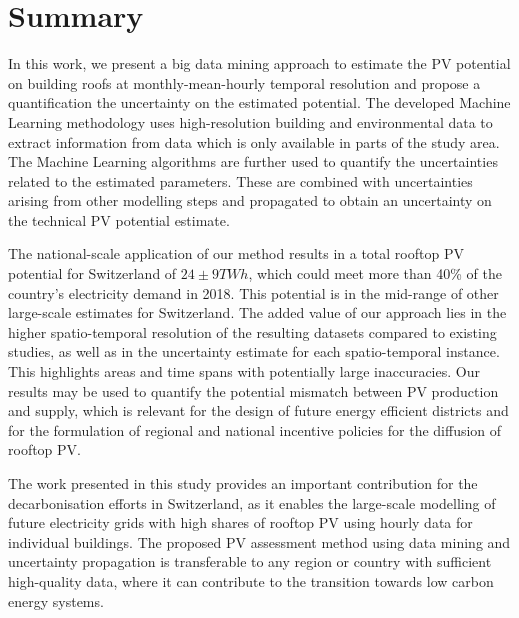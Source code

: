 
\section{Summary}
\label{solar_conclusion}

In this work, we present a big data mining approach to estimate the PV potential on building roofs at monthly-mean-hourly temporal resolution and propose a quantification the uncertainty on the estimated potential. 
The developed Machine Learning methodology uses high-resolution building and environmental data to extract information from data which is only available in parts of the study area.
%
The Machine Learning algorithms are further used to quantify the uncertainties related to the estimated parameters. These are combined with uncertainties arising from other modelling steps and propagated to obtain an uncertainty on the technical PV potential estimate. 

The national-scale application of our method results in a total rooftop PV potential for Switzerland of $24\pm9TWh$, which could meet more than 40\% of the country's electricity demand in 2018. 
This potential is in the mid-range of other large-scale estimates for Switzerland.
The added value of our approach lies in the higher spatio-temporal resolution of the resulting datasets compared to existing studies, as well as in the uncertainty estimate for each spatio-temporal instance.
This highlights areas and time spans with potentially large inaccuracies. 
Our results may be used to quantify the potential mismatch between PV production and supply, which is relevant for the design of future energy efficient districts and for the formulation of regional and national incentive policies for the diffusion of rooftop PV.

The work presented in this study provides an important contribution for the decarbonisation efforts in Switzerland, as it enables the large-scale modelling of future electricity grids with high shares of rooftop PV using hourly data for individual buildings. The proposed PV assessment method using data mining and uncertainty propagation is transferable to any region or country with sufficient high-quality data, where it can contribute to the transition towards low carbon energy systems.


